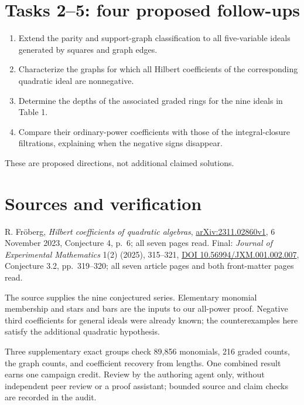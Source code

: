 \documentclass[11pt]{article}
\begin{document}
\section*{Tasks 2--5: four proposed follow-ups}
\begin{enumerate}[label=\textbf{Task \arabic*:},start=2,leftmargin=*]
\item Extend the parity and support-graph classification to all
five-variable ideals generated by squares and graph edges.
\item Characterize the graphs for which all Hilbert coefficients
of the corresponding quadratic ideal are nonnegative.
\item Determine the depths of the associated graded rings for
the nine ideals in Table 1.
\item Compare their ordinary-power coefficients with those of the
integral-closure filtrations, explaining when the negative signs disappear.
\end{enumerate}
These are proposed directions, not additional claimed solutions.

\section*{Sources and verification}
R. Fr\"oberg, \emph{Hilbert coefficients of quadratic algebras},
\href{https://arxiv.org/abs/2311.02860}{arXiv:2311.02860v1},
6 November 2023, Conjecture 4, p.~6; all seven pages read.
Final: \emph{Journal of Experimental Mathematics} 1(2) (2025),
315--321, \href{https://doi.org/10.56994/JXM.001.002.007}{DOI
10.56994/JXM.001.002.007}, Conjecture 3.2, pp.~319--320;
all seven article pages and both front-matter pages read.

The source supplies the nine conjectured series. Elementary monomial
membership and stars and bars are the inputs to our all-power proof.
Negative third coefficients for general ideals were already known;
the counterexamples here satisfy the additional quadratic hypothesis.

Three supplementary exact groups check 89,856 monomials, 216 graded
counts, the graph counts, and coefficient recovery from lengths.
One combined result earns one campaign credit. Review by the
authoring agent only, without independent peer review or a proof
assistant; bounded source and claim checks are recorded in the audit.
\end{document}
